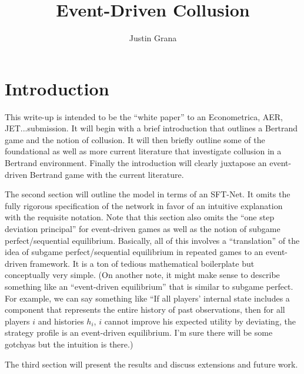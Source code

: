 \documentclass{article}
\begin{document}
\title{Event-Driven Collusion}
\author{Justin Grana}
\maketitle

\section{Introduction}
This write-up is intended to be the ``white paper'' to an
Econometrica, AER, JET...submission.  It will begin with a brief
introduction that outlines a Bertrand game and the notion of
collusion.  It will then briefly outline some of the foundational as
well as more current literature that investigate collusion in a
Bertrand environment.  Finally the introduction will clearly juxtapose
an event-driven Bertrand game with the current literature.

The second section will outline the model in terms of an SFT-Net.  It
omits the fully rigorous specification of the network in favor of an
intuitive explanation with the requisite notation.  Note that this
section also omits the ``one step deviation principal'' for
event-driven games as well as the notion of subgame perfect/sequential
equilibrium.  Basically, all of this involves a ``translation'' of the
idea of subgame perfect/sequential equilibrium in repeated games to an
event-driven framework.  It is a ton of tedious mathematical
boilerplate but conceptually very simple.  (On another note, it might
make sense to describe something like an ``event-driven equilibrium''
that is similar to subgame perfect.  For example, we can say something
like ``If all players' internal state includes a component that
represents the entire history of past observations, then for
all players $i$ and histories $h_i$, $i$ cannot improve his expected
utility by deviating, the strategy profile is an event-driven
equilibrium.  I'm sure there will be some gotchyas but the intuition
is there.)

The third section will present the results and discuss extensions and
future work.
\end{document}
